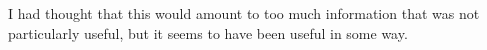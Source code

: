 	I had thought that this would amount to too much information that was not particularly useful, but it seems to have been useful in some way. 


